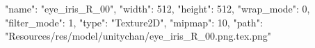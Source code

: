 {
  "name": "eye_iris_R_00",
  "width": 512,
  "height": 512,
  "wrap_mode": 0,
  "filter_mode": 1,
  "type": "Texture2D",
  "mipmap": 10,
  "path": "Resources/res/model/unitychan/eye_iris_R_00.png.tex.png"
}